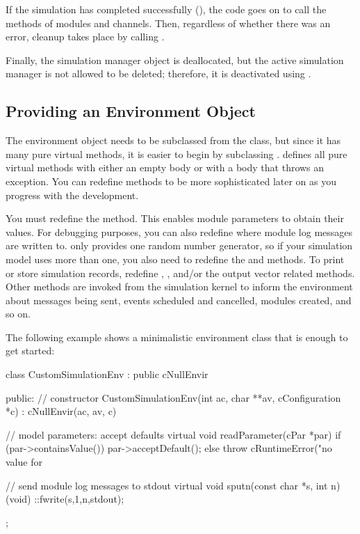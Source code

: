 If the simulation has completed successfully (), the code
goes on to call the  methods of modules and channels. Then,
regardless of whether there was an error, cleanup takes place by calling
.

Finally, the simulation manager object is deallocated, but the active
simulation manager is not allowed to be deleted; therefore, it is deactivated
using .


\subsection{Providing an Environment Object}
\label{sec:embedding:providing-an-environment-object}

The environment object needs to be subclassed from the  class,
but since it has many pure virtual methods, it is easier
to begin by subclassing .  defines all
pure virtual methods with either an empty body or with a body that throws
an  exception. You can redefine methods
to be more sophisticated later on as you progress with the development.

You must redefine the  method. This enables
module parameters to obtain their values. For debugging purposes, you can also
redefine  where module log messages are written to.
 only provides one random number generator, so if your
simulation model uses more than one, you also need to redefine the
 and  methods. To print or store
simulation records, redefine , ,
and/or the output vector related methods. Other  methods
are invoked from the simulation kernel to inform the environment about
messages being sent, events scheduled and cancelled, modules created, and so on.

The following example shows a minimalistic environment class that is enough
to get started:

\begin{cpp}
class CustomSimulationEnv : public cNullEnvir
{
  public:
    // constructor
    CustomSimulationEnv(int ac, char **av, cConfiguration *c) :
        cNullEnvir(ac, av, c) {}

    // model parameters: accept defaults
    virtual void readParameter(cPar *par) {
        if (par->containsValue())
            par->acceptDefault();
        else
            throw cRuntimeError("no value for %
    }

    // send module log messages to stdout
    virtual void sputn(const char *s, int n) {
        (void) ::fwrite(s,1,n,stdout);
    }
};
\end{cpp}


